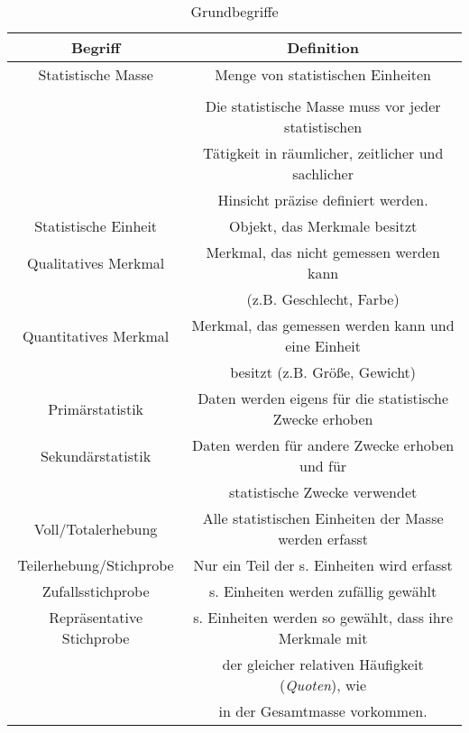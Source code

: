 \documentclass[12pt]{scrartcl}
\begin{document}
\begin{table}
    \begin{tabular}{ | c | c | }
        \hline
        Begriff                   & Definition                                              \\
        \hline
        \hline
        Statistische Masse        & Menge von statistischen Einheiten                       \\&\\
                                  & Die statistische Masse muss vor jeder statistischen     \\
                                  & Tätigkeit in räumlicher, zeitlicher und sachlicher      \\
                                  & Hinsicht präzise definiert werden.                      \\
        \hline
        Statistische Einheit      & Objekt, das Merkmale besitzt                            \\
        \hline
        Qualitatives Merkmal      & Merkmal, das nicht gemessen werden kann                 \\
                                  & (z.B. Geschlecht, Farbe)                                \\
        \hline
        Quantitatives Merkmal     & Merkmal, das gemessen werden kann und eine Einheit      \\
                                  & besitzt (z.B. Größe, Gewicht)                           \\
        \hline
        Primärstatistik           & Daten werden eigens für die statistische Zwecke erhoben \\
        \hline
        Sekundärstatistik         & Daten werden für andere Zwecke erhoben und für          \\
                                  & statistische Zwecke verwendet                           \\
        \hline
        Voll/Totalerhebung        & Alle statistischen Einheiten der Masse werden erfasst   \\
        \hline
        Teilerhebung/Stichprobe   & Nur ein Teil der s. Einheiten wird erfasst              \\
        \hline
        Zufallsstichprobe         & s. Einheiten werden zufällig gewählt                    \\
        \hline
        Repräsentative Stichprobe & s. Einheiten werden so gewählt, dass ihre Merkmale mit  \\
                                  & der gleicher relativen Häufigkeit (\emph{Quoten}), wie  \\
                                  & in der Gesamtmasse vorkommen.                           \\
        \hline

        \hline
    \end{tabular}
    \caption{Grundbegriffe}
\end{table}
\end{document}
